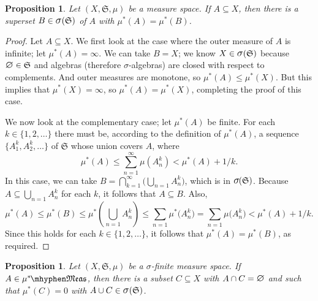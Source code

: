 \documentclass[
twoside=true,
paper=letter,
fontsize=9pt,
pagesize=auto,
leqno,
openany,
headsepline,
overfullrule,
]{scrbook}
\theoremstyle{plain}
\theoremstyle{plain}
\newtheorem{prop}[thm]{Proposition}
\theoremstyle{definition}
\theoremstyle{bfnoteitalic}
\theoremstyle{bfnoteroman}
\newcommand{\sigalg}[1]{\mathfrak{#1}}
\newcommand{\sagb}{\mathop{\hbox{\large{$\sigma$}}}\nolimits}
\newcommand{\textsigma}{\hbox{\large{$\sigma$}}\kern-1pt}
\newcommand{\mtset}{\hbox{\large{$\varnothing$}}}
\newcommand{\meets}{\cap}
\newcommand{\semiring}{\sigalg{S}}
\newcommand{\measurable}[1]{{#1}\mhyphen\mathfrak{Meas}}
\newcommand{\kernast}{\ast\kern-1pt}
\newcommand{\measurespace}{X}
\newcommand{\measure}{\mu}
\begin{document}
\begin{prop}\label{approximation_sigma_algebra}
Let $(\measurespace, \semiring, \measure)$ be a measure space. If 
$A\subseteq\measurespace$, then there is a superset 
$B\in \sagb(\semiring)$ of $A$ with $\measure^*(A) = \measure^*(B)$.
\end{prop}


\begin{proof}
Let $A\subseteq\measurespace$. 
We first look at the case where the outer measure of $A$  is infinite; let $\measure^*(A)=\infty$. We can take $B=\measurespace$; we know $\measurespace\in \sagb(\semiring)$ because $\mtset \in \semiring$ and algebras 
(therefore \textsigma-algebras) are closed with respect to complements.  And outer measures are monotone, so $\measure^*(A) \leq \measure^*(\measurespace)$. But this implies that $\measure^*(\measurespace)=\infty$, so $\measure^*(A) = \measure^*(\measurespace)$, completing the proof of this case.

We now look at the complementary case; let $\measure^*(A)$ be finite. For each $k\in\{1,2,\ldots\}$ there must be, according to the definition of $\measure^*(A)$, a sequence $\{A^k_1, A^k_2, \ldots \}$ of $\semiring$ whose union covers $A$, where
\[
\measure^*(A)\leq \sum_{n=1}^\infty\measure(A^k_n) < \measure^*(A) + 1/k.
\] 
In this case, we can take 
$B= \bigcap_{k=1}^\infty \bigl( \bigcup_{n = 1} A^k_n \bigr)$, which is in $\textsigma(\semiring)$. Because $A\subseteq \bigcup_{n = 1} A^k_n$ for each $k$, it follows that $A\subseteq B$.
Also, 
\[
\measure^*(A) \leq \measure^*(B) 
\leq \measure^*\left(\bigcup_{n = 1} A^k_n \right) 
\leq \sum_{n = 1} \measure^* \bigl( A^k_n \bigr)
= \sum_{n = 1} \measure \bigl( A^k_n \bigr)
< \measure^*(A) + 1/k.
\]
Since this holds for each $k\in\{1,2,\ldots\}$, it follows that $\measure^*(A) = \measure^*(B)$, as required.
\end{proof}





\begin{prop}\label{approximation_sigma_finite}
Let $(\measurespace, \semiring, \measure)$ be a \textsigma-finite measure space. If 
$A\in\measurable{\measure^\kernast}$, then there is a subset $C\subseteq\measurespace$ with $A\meets C =\mtset$ and  such that $\measure^*(C) = 0$ with $A\cup C\in \sagb(\semiring)$. 
\end{prop}
\end{document}
